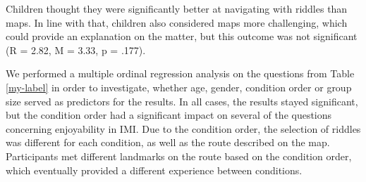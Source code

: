Children thought they were significantly better at navigating with riddles than maps. In line with that, children also considered maps more challenging, which could provide an explanation on the matter, but this outcome was not significant (R = 2.82, M = 3.33, p = .177).
 
We performed a multiple ordinal regression analysis on the questions from Table \ref{my-label} in order to investigate, whether age, gender, condition order or group size served as predictors for the results. In all cases, the results stayed significant, but the condition order had a significant impact on several of the questions concerning enjoyability in IMI. Due to the condition order, the selection of riddles was different for each condition, as well as the route described on the map. Participants met different landmarks on the route based on the condition order, which eventually provided a different experience between conditions. 

